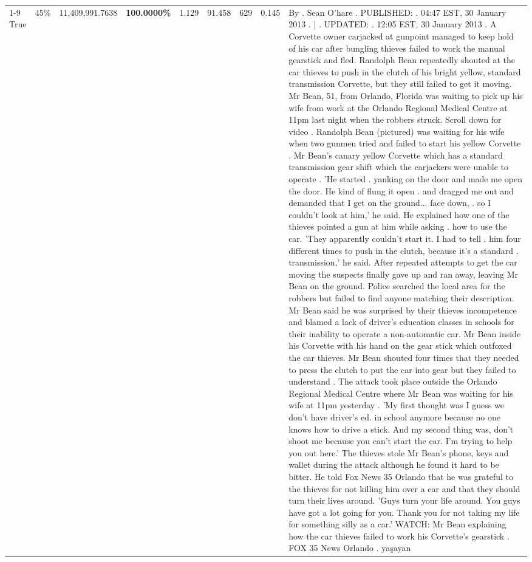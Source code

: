 \begin{table}[H]
\begin{tabular}{lllrlllll}
\cline{1-9} \cline{2-9}
True & 45\% & 11,409,991.7638 & \bfseries \color{red} 100.0000\% & 1.129 & 91.458 & 629 & 0.145 & By . Sean O'hare . PUBLISHED: . 04:47 EST, 30 January 2013 . | . UPDATED: . 12:05 EST, 30 January 2013 . A Corvette owner carjacked at gunpoint managed to keep hold of his car after bungling thieves failed to work the manual gearstick and fled. Randolph Bean repeatedly shouted at the car thieves to push in the clutch of his bright yellow, standard transmission Corvette, but they still failed to get it moving. Mr Bean, 51, from Orlando, Florida was waiting to pick up his wife from work at the Orlando Regional Medical Centre at 11pm last night when the robbers struck. Scroll down for video . Randolph Bean (pictured) was waiting for his wife when two gunmen tried and failed to start his yellow Corvette . Mr Bean's canary yellow Corvette which has a standard transmission gear shift which the carjackers were unable to operate . 'He started . yanking on the door and made me open the door. He kind of flung it open . and dragged me out and demanded that I get on the ground... face down, . so I couldn't look at him,' he said. He explained how one of the thieves pointed a gun at him while asking . how to use the car. 'They apparently couldn't start it. I had to tell . him four different times to push in the clutch, because it's a standard . transmission,' he said. After repeated attempts to get the car moving the suspects finally gave up and ran away, leaving Mr Bean on the ground. Police searched the local area for the robbers but failed to find anyone matching their description. Mr Bean said he was surprised by their thieves incompetence and blamed a lack of driver's education classes in schools for their inability to operate a non-automatic car. Mr Bean inside his Corvette with his hand on the gear stick which outfoxed the car thieves. Mr Bean shouted four times that they needed to press the clutch to put the car into gear but they failed to understand . The attack took place outside the Orlando Regional Medical Centre where Mr Bean was waiting for his wife at 11pm yesterday . 'My first thought was I guess we don't have driver's ed. in school anymore because no one knows how to drive a stick. And my second thing was, don't shoot me because you can't start the car. I'm trying to help you out here.' The thieves stole Mr Bean's phone, keys and wallet during the attack although he found it hard to be bitter. He told Fox News 35 Orlando that he was grateful to the thieves for not killing him over a car and that they should turn their lives around. 'Guys turn your life around. You guys have got a lot going for you. Thank you for not taking my life for something silly as a car.' WATCH: Mr Bean explaining how the car thieves failed to work his Corvette's gearstick . FOX 35 News Orlando . yaşayan \\

\end{tabular}
\end{table}
